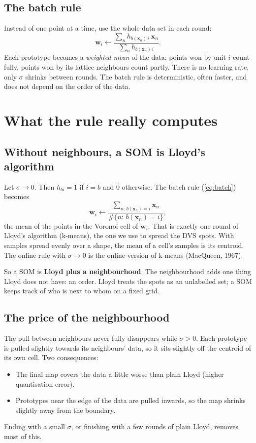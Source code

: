 \documentclass[11pt,a4paper]{article}
\newcommand{\vect}[1]{\mathbf{#1}}
\newcommand{\x}{\vect{x}}
\newcommand{\w}{\vect{w}}
\begin{document}
\subsection{The batch rule}
Instead of one point at a time, use the whole data set in each round:
\begin{equation}
\w_i\leftarrow\frac{\sum_{n}h_{b(\x_n)\,i}\ \x_n}{\sum_{n}h_{b(\x_n)\,i}} .\label{eq:batch}
\end{equation}
Each prototype becomes a \emph{weighted mean} of the data: points won by unit $i$ count fully, points won by its
lattice neighbours count partly. There is no learning rate, only $\sigma$ shrinks between rounds. The batch rule is
deterministic, often faster, and does not depend on the order of the data.

\section{What the rule really computes}

\subsection{Without neighbours, a SOM is Lloyd's algorithm}
\begin{whybox}
Let $\sigma\to0$. Then $h_{bi}=1$ if $i=b$ and $0$ otherwise. The batch rule (\ref{eq:batch}) becomes
\[
\w_i\leftarrow\frac{\sum_{n:\,b(\x_n)=i}\x_n}{\#\{n:\,b(\x_n)=i\}},
\]
the mean of the points in the Voronoi cell of $\w_i$. That is exactly one round of Lloyd's algorithm (k-means), the
one we use to spread the DVS spots. With samples spread evenly over a shape, the mean of a cell's samples is its
centroid. The online rule with $\sigma\to0$ is the online version of k-means (MacQueen, 1967).
\end{whybox}

So a SOM is \textbf{Lloyd plus a neighbourhood}. The neighbourhood adds one thing Lloyd does not have: an order. Lloyd
treats the spots as an unlabelled set; a SOM keeps track of who is next to whom on a fixed grid.

\subsection{The price of the neighbourhood}
The pull between neighbours never fully disappears while $\sigma>0$. Each prototype is pulled slightly towards its
neighbours' data, so it sits slightly off the centroid of its own cell. Two consequences:
\begin{itemize}[leftmargin=*]
\item The final map covers the data a little worse than plain Lloyd (higher quantisation error).
\item Prototypes near the edge of the data are pulled inwards, so the map shrinks slightly away from the boundary.
\end{itemize}
Ending with a small $\sigma$, or finishing with a few rounds of plain Lloyd, removes most of this.
\end{document}

